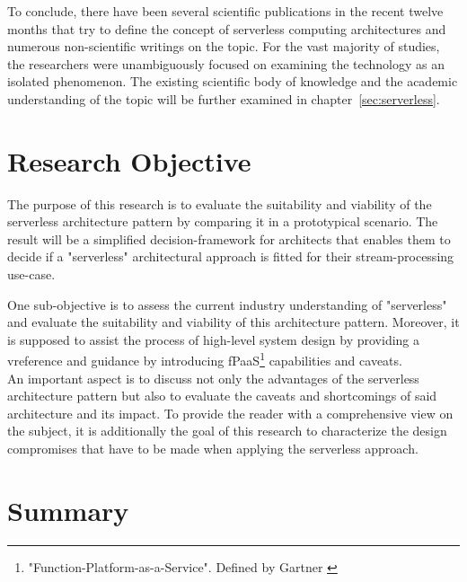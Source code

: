 To conclude, there have been several scientific publications in the recent twelve months that try to define the concept of serverless computing architectures and numerous non-scientific writings on the topic. For the vast majority of studies, the researchers were unambiguously focused on examining the technology as an isolated phenomenon. The existing scientific body of knowledge and the academic understanding of the topic will be further examined in chapter~\vref{sec:serverless}.

\section{Research Objective}

The purpose of this research is to evaluate the suitability and viability of the serverless architecture pattern by comparing it in a prototypical scenario. The result will be a simplified decision-framework for architects that enables them to decide if a "serverless" architectural approach is fitted for their stream-processing use-case.

One sub-objective is to assess the current industry understanding of "serverless" and evaluate the suitability and viability of this architecture pattern.
Moreover, it is supposed to assist the process of high-level system design by providing a vreference and guidance by introducing fPaaS\footnote{"Function-Platform-as-a-Service". Defined by Gartner \autocite{Chandrasekaran2017EvolutionWhen}} capabilities and caveats.\\
An important aspect is to discuss not only the advantages of the serverless architecture pattern but also to evaluate the caveats and shortcomings of said architecture and its impact. To provide the reader with a comprehensive view on the subject, it is additionally the goal of this research to characterize the design compromises that have to be made when applying the serverless approach.  

\section{Summary}

